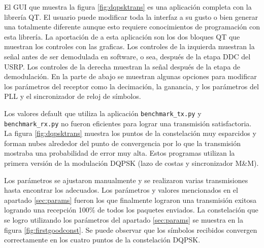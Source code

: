 El GUI que muestra la figura \ref{fig:dqpsktrans} es una aplicaci\'on completa con la librer\'ia QT.
El usuario puede modificar toda la interfaz a su gusto o bien generar una totalmente diferente aunque
esto requiere conocimientos de programaci\'on con esta librer\'ia. La aportaci\'on de \gnuradio a
esta aplicaci\'on son los dos bloques QT que muestran los controles con las graficas. Los controles
de la izquierda muestran la se\~nal antes de ser demodulada en software, o sea, despu\'es de la
etapa DDC del USRP. Los controles de la derecha muestran la se\~nal despu\'es de la etapa de
demodulaci\'on. En la parte de abajo se muestran algunas opciones para modificar los par\'ametros
del receptor como la decimaci\'on, la ganancia, y los par\'ametros del PLL y el sincronizador de
reloj de s\'imbolos.

Los valores default que utiliza la aplicaci\'on \verb|benchmark_tx.py| y \\
\verb|benchmark_rx.py| no fueron eficientes para lograr una transmisi\'on satisfactoria. La figura
\ref{fig:dqpsktrans} muestra los puntos de la constelaci\'on muy esparcidos y forman nubes alrededor
del punto de convergencia por lo que la transmisi\'on mostraba una probabilidad de error muy alta.
Estos programas utilizan la primera versi\'on de la modulaci\'on DQPSK (lazo de costas y sincronizador
M\&M).

Los par\'ametros se ajustaron manualmente y se realizaron varias transmisiones hasta encontrar
los adecuados. Los par\'ametros y valores mencionados en el apartado \ref{sec:params} fueron los que
finalmente lograron una transmisi\'on exitosa logrando una recepci\'on 100\% de todos los paquetes
enviados. La constelaci\'on que se logro utilizando los par\'ametros del apartado \ref{sec:params}
se muestra en la figura \ref{fig:firstgoodconst}. Se puede observar que los s\'imbolos recibidos
convergen correctamente en los cuatro puntos de la constelaci\'on DQPSK.

